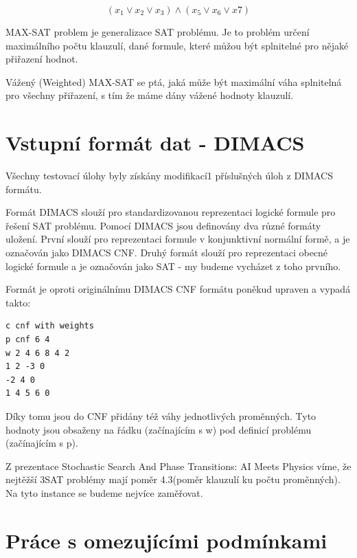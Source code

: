 \documentclass[a4paper,10pt,twocolumn]{article}
\begin{document}
$$
(x_1\lor x_2\lor x_3)\land (x_5\lor x_6\lor x7)
$$


MAX-SAT problem je generalizace SAT problému. Je to problém určení maximálního počtu klauzulí, dané formule, které můžou být splnitelné pro nějaké přiřazení hodnot.

Vážený (Weighted) MAX-SAT se ptá, jaká může být maximální váha splnitelná pro všechny přiřazení, s tím že máme dány vážené hodnoty klauzulí.

\section{Vstupní formát dat - DIMACS}

Všechny testovací úlohy byly získány modifikací1 příslušných úloh z DIMACS formátu. 

Formát DIMACS slouží pro standardizovanou reprezentaci logické formule pro řešení SAT problému. Pomocí DIMACS  jsou definovány dva různé formáty uložení. První slouží pro reprezentaci  formule v konjunktivní normální formě, a je označován jako DIMACS CNF. Druhý  formát  slouží  pro  reprezentaci  obecné  logické  formule a je označován jako SAT - my budeme vycházet z toho prvního.

Formát je oproti originálnímu DIMACS CNF formátu poněkud upraven a vypadá takto:
   \begin{verbatim}
c cnf with weights
p cnf 6 4
w 2 4 6 8 4 2
1 2 -3 0
-2 4 0
1 4 5 6 0
   \end{verbatim}

Díky tomu jsou do CNF přidány též váhy jednotlivých proměnných. Tyto hodnoty jsou obsaženy na řádku (začínajícím s w) pod definicí problému (začínajícím s p).


Z prezentace Stochastic Search And Phase Transitions: AI Meets Physics víme, že nejtěžší  3SAT problémy mají poměr 4.3(poměr klauzulí ku počtu proměnných). Na tyto instance se budeme nejvíce zaměřovat.




\section{Práce s omezujícími podmínkami}
\end{document}
